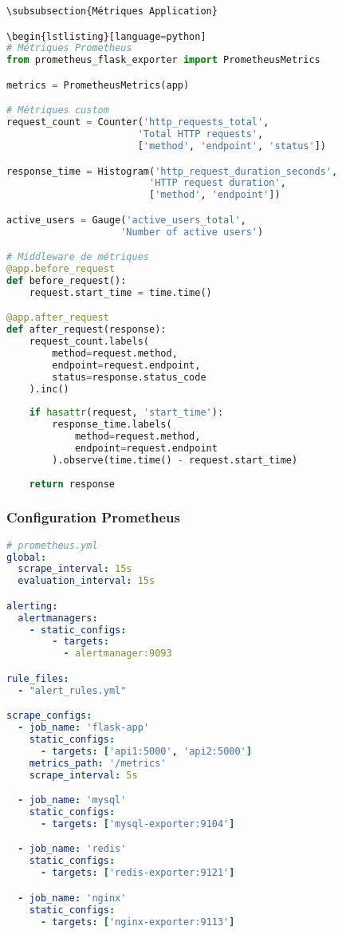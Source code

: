 \begin{lstlisting}[language=python]
\subsubsection{Métriques Application}

\begin{lstlisting}[language=python]
# Métriques Prometheus
from prometheus_flask_exporter import PrometheusMetrics

metrics = PrometheusMetrics(app)

# Métriques custom
request_count = Counter('http_requests_total', 
                       'Total HTTP requests', 
                       ['method', 'endpoint', 'status'])

response_time = Histogram('http_request_duration_seconds',
                         'HTTP request duration',
                         ['method', 'endpoint'])

active_users = Gauge('active_users_total',
                    'Number of active users')

# Middleware de métriques
@app.before_request
def before_request():
    request.start_time = time.time()

@app.after_request
def after_request(response):
    request_count.labels(
        method=request.method,
        endpoint=request.endpoint,
        status=response.status_code
    ).inc()
    
    if hasattr(request, 'start_time'):
        response_time.labels(
            method=request.method,
            endpoint=request.endpoint
        ).observe(time.time() - request.start_time)
    
    return response
\end{lstlisting}

\subsubsection{Configuration Prometheus}

\begin{lstlisting}[language=yaml]
# prometheus.yml
global:
  scrape_interval: 15s
  evaluation_interval: 15s

alerting:
  alertmanagers:
    - static_configs:
        - targets:
          - alertmanager:9093

rule_files:
  - "alert_rules.yml"

scrape_configs:
  - job_name: 'flask-app'
    static_configs:
      - targets: ['api1:5000', 'api2:5000']
    metrics_path: '/metrics'
    scrape_interval: 5s

  - job_name: 'mysql'
    static_configs:
      - targets: ['mysql-exporter:9104']

  - job_name: 'redis'
    static_configs:
      - targets: ['redis-exporter:9121']

  - job_name: 'nginx'
    static_configs:
      - targets: ['nginx-exporter:9113']
\end{lstlisting}

